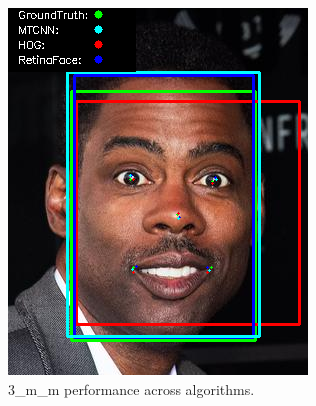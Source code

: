 \documentclass{l4proj}
\begin{document}
\begin{appendices}
\begin{figure}[h!]
\begin{minipage}{0.49\textwidth}
     \includegraphics[width=\textwidth]{images/appendix/3.png}
    \caption{3\_m\_m performance across algorithms.}
    \label{whoopi_result}
  \end{minipage}
\end{figure}


\end{appendices}
\end{document}
